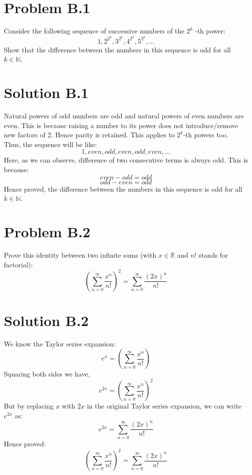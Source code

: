 \documentclass{article}
\begin{document}
\newpage
\section*{Problem B.1}
Consider the following sequence of successive numbers of the $2^{k}$ -th power:
$$
1,2^{2^{k}}, 3^{2^{k}}, 4^{2^{k}}, 5^{2^{k}}, \ldots
$$
Show that the difference between the numbers in this sequence is odd for all $k \in \mathbb{N}$.
\section*{Solution B.1}
Natural powers of odd numbers are odd and natural powers of even numbers are even. This is because raising a number to its power does not introduce/remove new factors of 2. Hence parity is retained. This applies to $2^{k}$-th powers too. \\
Thus, the sequence will be like:
\[1, even, odd, even, odd, even, \ldots\]
Here, as we can observe, difference of two consecutive terms is always odd. This is because:
\[even-odd = odd\]
\[odd-even = odd\]
Hence proved, the difference between the numbers in this sequence is odd for all $k \in \mathbb{N}$.

\newpage
\section*{Problem B.2}
Prove this identity between two infinite sums (with $x \in \mathbb{R}$ and $n !$ stands for factorial):
$$
\left(\sum_{n=0}^{\infty} \frac{x^{n}}{n!}\right)^{2}=\sum_{n=0}^{\infty} \frac{(2 x)^{n}}{n!}
$$
\section*{Solution B.2}
We know the Taylor series expansion:
\[e^{x}=\left(\sum_{n=0}^{\infty} \frac{x^{n}}{n !}\right)\]
Squaring both sides we have,
\[e^{2x}=\left(\sum_{n=0}^{\infty} \frac{x^{n}}{n !}\right)^{2}\]
But by replacing $x$ with $2x$ in the original Taylor series expansion, we can write $e^{2x}$ as:
\[e^{2x}=\sum_{n=0}^{\infty} \frac{(2 x)^{n}}{n!}\]
Hence proved:
\[\boxed{\left(\sum_{n=0}^{\infty} \frac{x^{n}}{n!}\right)^{2}=\sum_{n=0}^{\infty} \frac{(2 x)^{n}}{n!}}\]
\end{document}
